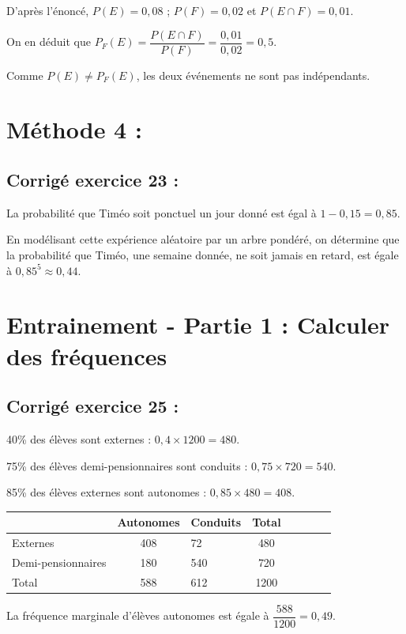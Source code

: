\documentclass[12pt,a4paper]{book}
\begin{document}
D'après l'énoncé, $P(E)=0,08$ ; $P(F)=0,02$ et $P(E\cap F)=0,01$.

On en déduit que $P_F(E)=\dfrac{P(E\cap F)}{P(F)}=\dfrac{0,01}{0,02}=0,5$.

Comme $P(E)\neq P_F(E)$, les deux événements ne sont pas indépendants.

\section*{Méthode 4 :}

\subsection*{Corrigé exercice 23 :}

La probabilité que Timéo soit ponctuel un jour donné est égal à $1-0,15=0,85$.

En modélisant cette expérience aléatoire par un arbre pondéré, on détermine que la probabilité que Timéo, une semaine donnée, ne soit jamais en retard, est égale à $0,85^5\approx 0,44$.

\section*{Entrainement - Partie 1 : Calculer des fréquences}

\subsection*{Corrigé exercice 25 :}


\begin{enumMet}
	\item 40\% des élèves sont externes : $0,4\times 1200=480$.
	
	75\% des élèves demi-pensionnaires sont conduits : $0,75\times 720=540$.
	
	85\% des élèves externes sont autonomes : $0,85\times 480=408$.
	\begin{center}
		\begin{tabular}{ | Xc | Xc | Xc | Xc | }
			\hline & Autonomes & Conduits & Total\\ \hline
			Externes & 408 & 72 & 480\\ \hline
			Demi-pensionnaires & 180 & 540 & 720\\ \hline
			Total & 588 & 612 & 1200\\ \hline
		\end{tabular}
	\end{center}
	\item La fréquence marginale d'élèves autonomes est égale à $\dfrac{588}{1200} = 0,49$.
\end{enumMet}
\end{document}
